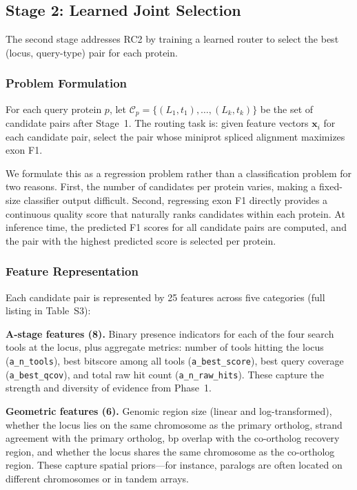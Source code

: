\subsection{Stage 2: Learned Joint Selection}

The second stage addresses RC2 by training a learned router to select the best (locus, query-type) pair for each protein.

\subsubsection{Problem Formulation}

For each query protein $p$, let $\mathcal{C}_p = \{(L_1, t_1), \dots, (L_k, t_k)\}$ be the set of candidate pairs after Stage~1. The routing task is: given feature vectors $\mathbf{x}_i$ for each candidate pair, select the pair whose miniprot spliced alignment maximizes exon F1.

We formulate this as a regression problem rather than a classification problem for two reasons. First, the number of candidates per protein varies, making a fixed-size classifier output difficult. Second, regressing exon F1 directly provides a continuous quality score that naturally ranks candidates within each protein. At inference time, the predicted F1 scores for all candidate pairs are computed, and the pair with the highest predicted score is selected per protein.

\subsubsection{Feature Representation}

Each candidate pair is represented by 25 features across five categories (full listing in Table~S3):

\textbf{A-stage features (8).} Binary presence indicators for each of the four search tools at the locus, plus aggregate metrics: number of tools hitting the locus (\texttt{a\_n\_tools}), best bitscore among all tools (\texttt{a\_best\_score}), best query coverage (\texttt{a\_best\_qcov}), and total raw hit count (\texttt{a\_n\_raw\_hits}). These capture the strength and diversity of evidence from Phase~1.

\textbf{Geometric features (6).} Genomic region size (linear and log-transformed), whether the locus lies on the same chromosome as the primary ortholog, strand agreement with the primary ortholog, bp overlap with the co-ortholog recovery region, and whether the locus shares the same chromosome as the co-ortholog region. These capture spatial priors---for instance, paralogs are often located on different chromosomes or in tandem arrays.

